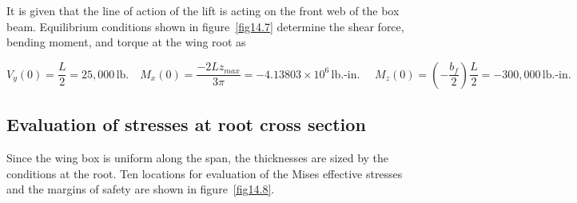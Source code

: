 \documentclass{AeroStructure-ERJohnson}
\begin{document}
It is given that the line of action of the lift is acting on the front web of the box beam. Equilibrium conditions shown in figure~\ref{fig14.7} determine the shear force, bending moment, and torque at the wing root as

{\def\thefigure{14.7}
}

\vspace*{-1pc}

\[
V_{y}(0)=\frac{L}{2}=25{,}000\,\mathrm{lb}. \quad M_{x}(0)=\frac{-2 L z_{max }}{3 \pi}=-4.13803 \times 10^{6}\,\mathrm{lb}. \text{-in. } \quad M_{z}(0)=\left(-\frac{b_{f}}{2}\right) \frac{L}{2}=-300{,}000\,\mathrm{lb}.\mbox{-}\mathrm{in}.
\]

\vspace*{-1pc}

\subsection{Evaluation of stresses at root cross section}\label{sec14.2.1}
Since the wing box is uniform along the span, the thicknesses are sized by the conditions at the root. Ten locations for evaluation of the Mises effective stresses and the margins of safety are shown in figure~\ref{fig14.8}.

\end{document}
